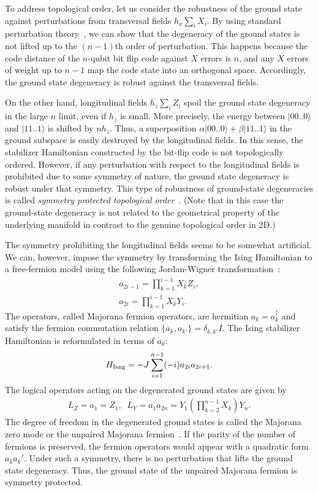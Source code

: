 To address topological order, let us consider the robustness of the ground state against perturbations from transversal fields $h_x\sum _i X_i$.
By using standard perturbation theory~\cite{Kato}, we can show that the degeneracy of the ground states is not lifted up to the $(n-1)$th order of perturbation.
This happens because the code distance of the $n$-qubit bit flip code against $X$ errors is $n$, and any $X$ errors of weight up to $n-1$ map the code state into an orthogonal space.
Accordingly, the ground state degeneracy is robust against the transversal fields.

On the other hand, longitudinal fields $h_z \sum _{i}Z_i$ spoil the ground state degeneracy in the large $n$ limit, even if $h_z$ is small. 
More precisely, the energy between $|00..0\rangle$ and $|11..1\rangle$ is shifted by $n h_z$.
Thus, a superposition $\alpha |00..0\rangle + \beta |11..1\rangle$ in the ground subspace is easily destroyed by the longitudinal fields.
In this sense, the stabilizer Hamiltonian constructed by the bit-flip code is not topologically ordered.
However, if any perturbation with respect to the longitudinal fields is prohibited due to some symmetry of nature, the ground state degeneracy is robust under that symmetry.
This type of robustness of ground-state degeneracies is called {\it symmetry protected topological order}~\cite{SymmetGuWen,SymmetPollMann}.
(Note that in this case the ground-state degeneracy is 
not related to the geometrical property of the underlying manifold
in contrast to the genuine topological order in 2D.)

The symmetry prohibiting the longitudinal fields seems to be somewhat artificial.
We can, however, impose the symmetry by transforming the Ising Hamiltonian to a free-fermion model using the following Jordan-Wigner transformation~\cite{JWtrans}:
\begin{eqnarray}
a_{2i-1} =\prod _{k=1}^{i-1} X_k Z_i,
\\
a_{2i} = \prod _{k=1}^{i-1} X_k Y_i.
\end{eqnarray}
The operators, called Majorana fermion operators, are hermitian $a_k= a_k^{\dag}$ and satisfy the fermion commutation relation 
$\{ a_{k}, a_{k'} \} = \delta _{k,k'}I$.
The Ising stabilizer Hamiltonian is reformulated in terms of $a_k$:
\begin{eqnarray}
H_{\rm Isng}= -J \sum_{i=1}^{n-1} (-i) a_{2i} a_{2i+1}.
\end{eqnarray}
The logical operators acting on the degenerated ground states are given by
\begin{eqnarray}
L_Z=a_1=Z_1, \;\; L_Y=a_{1} a_{2n}= Y_1 \left(\prod _{k=2}^{n-1}X_k \right) Y_n.
\end{eqnarray}
The degree of freedom in the degenerated ground states is called the Majorana zero mode or the unpaired Majorana fermion~\cite{KitaevMajorana}.
If the parity of the number of fermions is preserved, the fermion operators would appear with a quadratic form $a_k a_k'$.
Under such a symmetry, there is no perturbation that lifts the ground state degeneracy. 
Thus, the ground state of the unpaired Majorana fermion is symmetry protected.

